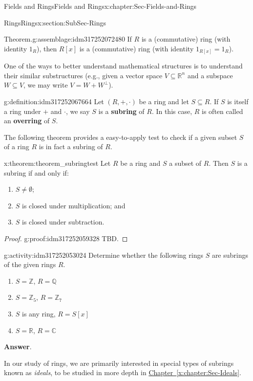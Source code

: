 \documentclass[oneside,10pt,]{book}
\newcommand{\blocktitlefont}{\relax}
\newcommand{\xreffont}{\relax}
\newcommand{\terminology}[1]{\textbf{#1}}
\numberwithin{equation}{section}
\def\C{{\mathbb C}}
\def\Z{{\mathbb Z}}
\def\Q{{\mathbb Q}}
\def\R{{\mathbb R}}
\begin{document}
\begin{chapterptx}{Fields and Rings}{}{Fields and Rings}{}{}{x:chapter:Sec-Fields-and-Rings}
\begin{sectionptx}{Rings}{}{Rings}{}{}{x:section:SubSec-Rings}
\begin{assemblage}{Theorem.}{g:assemblage:idm317252072480}
If \(R\) is a (commutative) ring (with identity \(1_R\)), then \(R[x]\) is a (commutative) ring (with identity \(1_{R[x]} = 1_R\)).%
\end{assemblage}
One of the ways to better understand mathematical structures is to understand their similar substructures (e.g., given a vector space \(V\subseteq \R^n\) and a subspace \(W\subseteq V\), we may write \(V = W + W^\perp\)). %
\begin{definition}{}{g:definition:idm317252067664}%
%
%
Let \((R,+,\cdot)\) be a ring and let \(S\subseteq R\). If \(S\) is itself a ring under \(+\) and \(\cdot\), we say \(S\) is a \terminology{subring} of \(R\). In this case, \(R\) is often called an \terminology{overring} of \(S\).%
\end{definition}
The following theorem provides a easy-to-apply test to check if a given subset \(S\) of a ring \(R\) is in fact a subring of \(R\).%
\begin{theorem}{}{}{x:theorem:theorem_subringtest}%
%
Let \(R\) be a ring and \(S\) a subset of \(R\). Then \(S\) is a subring if and only if:%
\begin{enumerate}
\item{}\(S\ne \emptyset\);%
\item{}\(S\) is closed under multiplication; and%
\item{}\(S\) is closed under subtraction.%
\end{enumerate}
%
\end{theorem}
\begin{proof}{}{g:proof:idm317252059328}
TBD.%
\end{proof}
\begin{activity}{}{g:activity:idm317252053024}%
Determine whether the following rings \(S\) are subrings of the given rings \(R\).%
\begin{enumerate}
\item{}\(S = \Z\), \(R = \Q\)%
\item{}\(S = \Z_{5}\), \(R = \Z_{7}\)%
\item{}\(S\) is any ring, \(R = S[x]\)%
\item{}\(S = \R\), \(R = \C\)%
\end{enumerate}
%
\par\smallskip%
\noindent\textbf{\blocktitlefont Answer}.\hypertarget{g:answer:idm317252045200}{}\quad{}\end{activity}
In our study of rings, we are primarily interested in special types of subrings known as \emph{ideals}, to be studied in more depth in \hyperref[x:chapter:Sec-Ideals]{Chapter~{\xreffont\ref{x:chapter:Sec-Ideals}}}.%

\end{sectionptx}
\end{chapterptx}
\end{document}
